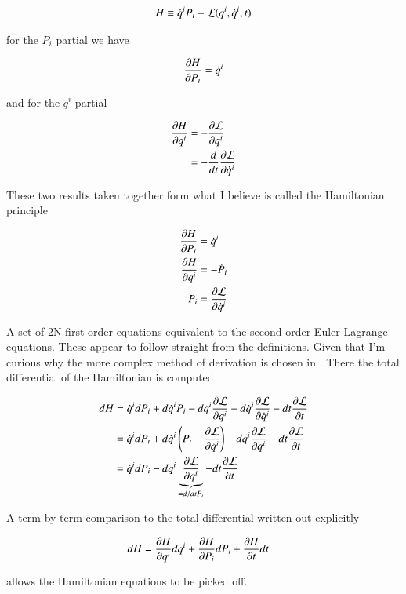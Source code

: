 \begin{align}\label{eqn:hamiltonian:hoo1}
H \equiv \qdot^i P_i -\LL(q^i, \qdot^i, t)
\end{align}

for the $P_i$ partial we have

\begin{align*}
\PD{P_i}{H} = \qdot^i
\end{align*}

and for the $q^i$ partial

\begin{align*}
\PD{q^i}{H} 
&= -\PD{q^i}{\LL} \\
&= - \frac{d}{dt} \PD{\qdot^i}{\LL} 
\end{align*}

These two results taken together form what I believe is called the Hamiltonian principle

\begin{align}\label{eqn:hamiltonian:hoo3}
\PD{P_i}{H} &= \qdot^i \\
\PD{q^i}{H} &= - \dot{P}_i \\
P_i &= \PD{\qdot^i}{\LL} 
\end{align}

A set of 2N first order equations equivalent to the second order Euler-Lagrange equations.  These appear to follow straight from the definitions.  Given that I'm curious why the more complex method of derivation is chosen in \cite{goldstein1951cm}.  There the total differential of the Hamiltonian is computed

\begin{align*}
dH &= 
\qdot^i dP_i 
+ d\qdot^i P_i 
- dq^i \PD{q^i}{\LL}
- d \qdot^i \PD{\qdot^i}{\LL}
- dt \PD{t}{\LL} \\
&= 
\qdot^i dP_i 
+ d\qdot^i \left( P_i - \PD{\qdot^i}{\LL} \right)
- dq^i \PD{q^i}{\LL}
- dt \PD{t}{\LL} \\
&= 
\qdot^i dP_i 
- dq^i \underbrace{\PD{q^i}{\LL}}_{= d/dt P_i}
- dt \PD{t}{\LL} \\
\end{align*}

A term by term comparison to the total differential written out explicitly

\begin{align}\label{eqn:hamiltonian:hoo4}
dH &= 
\PD{q^i}{H} d q^i
+\PD{P_i}{H} d P_i
+\PD{t}{H} dt
\end{align}

allows the Hamiltonian equations to be picked off.

